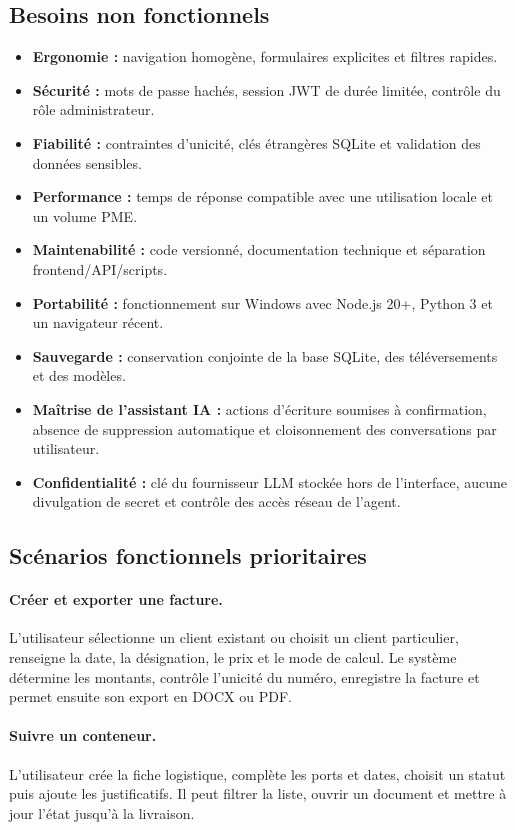 \documentclass[12pt,a4paper,oneside]{report}
\begin{document}
\subsection{Besoins non fonctionnels}
\begin{itemize}
  \item \textbf{Ergonomie :} navigation homogène, formulaires explicites et filtres rapides.
  \item \textbf{Sécurité :} mots de passe hachés, session JWT de durée limitée, contrôle du rôle administrateur.
  \item \textbf{Fiabilité :} contraintes d'unicité, clés étrangères SQLite et validation des données sensibles.
  \item \textbf{Performance :} temps de réponse compatible avec une utilisation locale et un volume PME.
  \item \textbf{Maintenabilité :} code versionné, documentation technique et séparation frontend/API/scripts.
  \item \textbf{Portabilité :} fonctionnement sur Windows avec Node.js 20+, Python 3 et un navigateur récent.
  \item \textbf{Sauvegarde :} conservation conjointe de la base SQLite, des téléversements et des modèles.
  \item \textbf{Maîtrise de l'assistant IA :} actions d'écriture soumises à confirmation, absence de suppression automatique et cloisonnement des conversations par utilisateur.
  \item \textbf{Confidentialité :} clé du fournisseur LLM stockée hors de l'interface, aucune divulgation de secret et contrôle des accès réseau de l'agent.
\end{itemize}

\subsection{Scénarios fonctionnels prioritaires}
\paragraph{Créer et exporter une facture.}
L'utilisateur sélectionne un client existant ou choisit un client particulier, renseigne la date, la désignation, le prix et le mode de calcul. Le système détermine les montants, contrôle l'unicité du numéro, enregistre la facture et permet ensuite son export en DOCX ou PDF.

\paragraph{Suivre un conteneur.}
L'utilisateur crée la fiche logistique, complète les ports et dates, choisit un statut puis ajoute les justificatifs. Il peut filtrer la liste, ouvrir un document et mettre à jour l'état jusqu'à la livraison.
\end{document}

